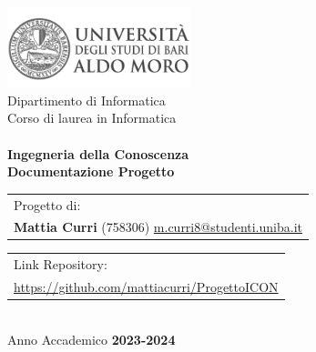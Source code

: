 \begin{titlepage}
    \begin{center}
        \includegraphics[width=0.4\textwidth]{img/logo_uniba}\\
        \vspace{1cm}
        {\large Dipartimento di Informatica}\\
        \vspace{1cm}
        {\large Corso di laurea in Informatica}\\
        \hrulefill \\
        \vspace{2cm}
        {\large \textbf{Ingegneria della Conoscenza}}\\
        \vspace{2cm}
        {\LARGE\textbf{Documentazione Progetto}}\\
        \vspace{2cm}

       \begin{table}[ht]
          \centering
          \begin{tabularx}{\textwidth}{@{}X@{}}
              Progetto di: \\
              \textbf{Mattia Curri} (758306) \href{mailto:m.curri8@studenti.uniba.it}{m.curri8@studenti.uniba.it} \\
          \end{tabularx}
      \end{table}
      \vspace{1cm}

      \begin{table}[ht]
        \centering
        \begin{tabularx}{\textwidth}{@{}X@{}}
            Link Repository: \\
            \href{https://github.com/mattiacurri/ProgettoICON}{https://github.com/mattiacurri/ProgettoICON} \\
        \end{tabularx}
    \end{table}

        \vspace{4cm}
        \hrulefill \\
        \vspace{1cm}
        {\large Anno Accademico \textbf{2023-2024}}
    \end{center}
\end{titlepage}